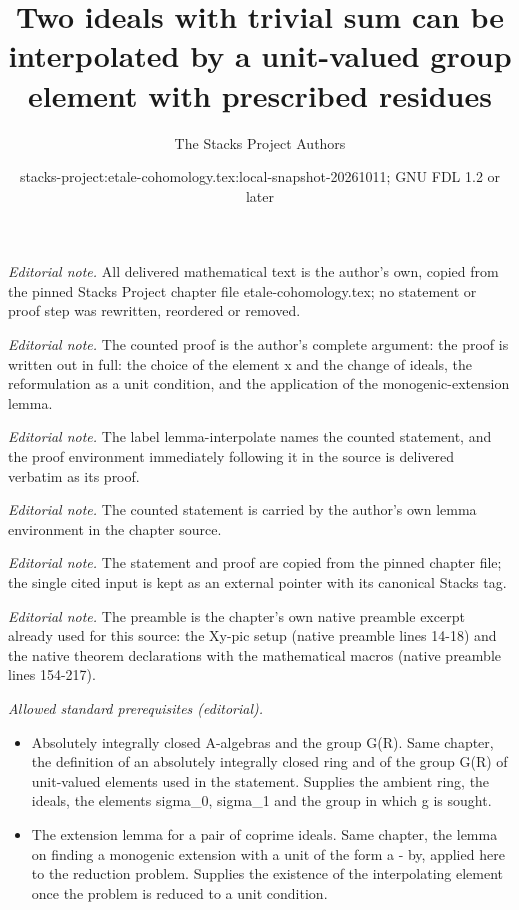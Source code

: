 \documentclass[10pt,a4paper]{amsart}
\title{Two ideals with trivial sum can be interpolated by a unit-valued group element with prescribed residues}
\author{The Stacks Project Authors}
\date{stacks-project:etale-cohomology.tex:local-snapshot-20261011; GNU FDL 1.2 or later}
\theoremstyle{plain}
\theoremstyle{definition}
\theoremstyle{remark}
\numberwithin{equation}{subsection}
\begin{document}
\maketitle
\noindent\textit{Editorial note.} All delivered mathematical text is the author's own, copied from the pinned Stacks Project chapter file etale-cohomology.tex; no statement or proof step was rewritten, reordered or removed.\par\medskip
\noindent\textit{Editorial note.} The counted proof is the author's complete argument: the proof is written out in full: the choice of the element x and the change of ideals, the reformulation as a unit condition, and the application of the monogenic-extension lemma.\par\medskip
\noindent\textit{Editorial note.} The label lemma-interpolate names the counted statement, and the proof environment immediately following it in the source is delivered verbatim as its proof.\par\medskip
\noindent\textit{Editorial note.} The counted statement is carried by the author's own lemma environment in the chapter source.\par\medskip
\noindent\textit{Editorial note.} The statement and proof are copied from the pinned chapter file; the single cited input is kept as an external pointer with its canonical Stacks tag.\par\medskip
\noindent\textit{Editorial note.} The preamble is the chapter's own native preamble excerpt already used for this source: the Xy-pic setup (native preamble lines 14-18) and the native theorem declarations with the mathematical macros (native preamble lines 154-217).\par\medskip
\noindent\textit{Allowed standard prerequisites (editorial).}\begin{itemize}
\item Absolutely integrally closed A-algebras and the group G(R). Same chapter, the definition of an absolutely integrally closed ring and of the group G(R) of unit-valued elements used in the statement. Supplies the ambient ring, the ideals, the elements sigma\_0, sigma\_1 and the group in which g is sought.
\item The extension lemma for a pair of coprime ideals. Same chapter, the lemma on finding a monogenic extension with a unit of the form a - by, applied here to the reduction problem. Supplies the existence of the interpolating element once the problem is reduced to a unit condition.
\end{itemize}\medskip
\end{document}

